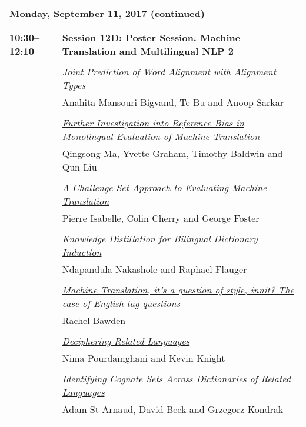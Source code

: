 \begin{tabular}{p{20mm}p{128mm}}
\\
\multicolumn{2}{l}{\bf Monday, September 11, 2017 (continued)} \\\\
\\{\bf 10:30--12:10} & {\bf Session 12D: Poster Session. Machine Translation and Multilingual NLP 2 } \\
\\
 & {\em Joint Prediction of Word Alignment with Alignment Types}\\
         & Anahita Mansouri Bigvand, Te Bu and Anoop Sarkar \\
\\

 & \hyperlink{page.2459}{\em Further Investigation into Reference Bias in Monolingual Evaluation of Machine Translation}\\
         & Qingsong Ma, Yvette Graham, Timothy Baldwin and Qun Liu \\
\\

 & \hyperlink{page.2469}{\em A Challenge Set Approach to Evaluating Machine Translation}\\
         & Pierre Isabelle, Colin Cherry and George Foster \\
\\

 & \hyperlink{page.2480}{\em Knowledge Distillation for Bilingual Dictionary Induction}\\
         & Ndapandula Nakashole and Raphael Flauger \\
\\

 & \hyperlink{page.2490}{\em Machine Translation, it's a question of style, innit? The case of English tag questions}\\
         & Rachel Bawden \\
\\

 & \hyperlink{page.2496}{\em Deciphering Related Languages}\\
         & Nima Pourdamghani and Kevin Knight \\
\\

 & \hyperlink{page.2502}{\em Identifying Cognate Sets Across Dictionaries of Related Languages}\\
         & Adam St Arnaud, David Beck and Grzegorz Kondrak \\
\\


\end{tabular}
